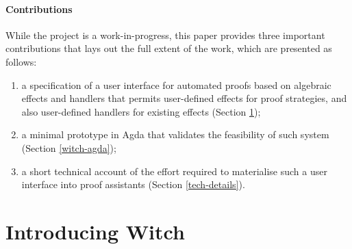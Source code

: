 \documentclass[sigconfl]{acmart}
\begin{document}
\paragraph{Contributions} While the project is a work-in-progress, this paper
provides three important contributions that lays out the full extent of the
work, which are presented as follows:
\begin{enumerate}
\item a specification of a user interface for automated proofs based on
  algebraic effects and handlers that permits user-defined effects for proof
  strategies, and also user-defined handlers for existing effects (Section \ref{intro-witch});
\item a minimal prototype in Agda that validates the feasibility of such system
  (Section \ref{witch-agda});
\item a short technical account of the effort required to materialise such a
  user interface into proof assistants (Section \ref{tech-details}).
\end{enumerate}

\section{Introducing Witch} \label{intro-witch}
\end{document}
